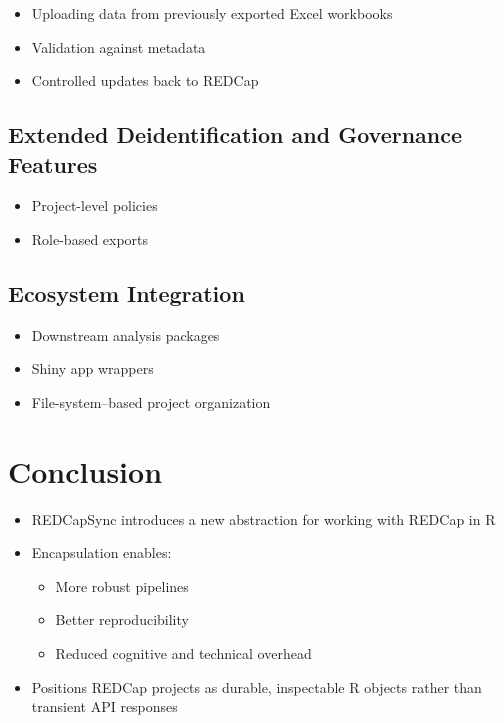 \begin{itemize}
\tightlist
\item
  Uploading data from previously exported Excel workbooks\\
\item
  Validation against metadata\\
\item
  Controlled updates back to REDCap
\end{itemize}

\subsection{Extended Deidentification and Governance Features}\label{extended-deidentification-and-governance-features}

\begin{itemize}
\tightlist
\item
  Project-level policies\\
\item
  Role-based exports
\end{itemize}

\subsection{Ecosystem Integration}\label{ecosystem-integration}

\begin{itemize}
\tightlist
\item
  Downstream analysis packages\\
\item
  Shiny app wrappers\\
\item
  File-system--based project organization
\end{itemize}

\section{Conclusion}\label{conclusion}

\begin{itemize}
\tightlist
\item
  REDCapSync introduces a new abstraction for working with REDCap in R\\
\item
  Encapsulation enables:

  \begin{itemize}
  \tightlist
  \item
    More robust pipelines\\
  \item
    Better reproducibility\\
  \item
    Reduced cognitive and technical overhead\\
  \end{itemize}
\item
  Positions REDCap projects as durable, inspectable R objects rather than transient API responses
\end{itemize}

